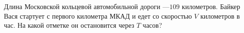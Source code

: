 Длина Московской кольцевой автомобильной дороги ---$109$ километров. Байкер Вася стартует с первого километра МКАД и едет со скоростью $V$ километров в час. На какой отметке он остановится через $T$ часов?